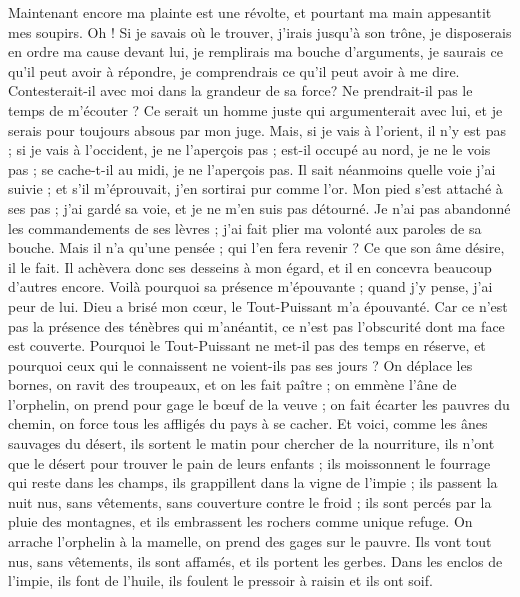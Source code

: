 \begin{multicols}{2}
Maintenant encore ma plainte est une révolte, et pourtant ma main appesantit mes soupirs.
Oh ! Si je savais où le trouver, j'irais jusqu'à son trône,
je disposerais en ordre ma cause devant lui, je remplirais ma bouche d'arguments,
je saurais ce qu'il peut avoir à répondre, je comprendrais ce qu'il peut avoir à me dire.
Contesterait-il avec moi dans la grandeur de sa force? Ne prendrait-il pas le temps de m'écouter ?
Ce serait un homme juste qui argumenterait avec lui, et je serais pour toujours absous par mon juge.
Mais, si je vais à l'orient, il n'y est pas ; si je vais à l'occident, je ne l'aperçois pas ;
est-il occupé au nord, je ne le vois pas ; se cache-t-il au midi, je ne l'aperçois pas.
Il sait néanmoins quelle voie j'ai suivie ; et s'il m'éprouvait, j'en sortirai pur comme l'or.
Mon pied s'est attaché à ses pas ; j'ai gardé sa voie, et je ne m'en suis pas détourné.
Je n'ai pas abandonné les commandements de ses lèvres ; j'ai fait plier ma volonté aux paroles de sa bouche.
Mais il n'a qu'une pensée ; qui l'en fera revenir ? Ce que son âme désire, il le fait.
Il achèvera donc ses desseins à mon égard, et il en concevra beaucoup d'autres encore.
Voilà pourquoi sa présence m'épouvante ; quand j'y pense, j'ai peur de lui.
Dieu a brisé mon cœur, le Tout-Puissant m'a épouvanté.
Car ce n'est pas la présence des ténèbres qui m'anéantit, ce n'est pas l'obscurité dont ma face est couverte.
\VerseOne{}Pourquoi le Tout-Puissant ne met-il pas des temps en réserve, et pourquoi ceux qui le connaissent ne voient-ils pas ses jours ?
On déplace les bornes, on ravit des troupeaux, et on les fait paître ;
on emmène l'âne de l'orphelin, on prend pour gage le bœuf de la veuve ;
on fait écarter les pauvres du chemin, on force tous les affligés du pays à se cacher.
Et voici, comme les ânes sauvages du désert, ils sortent le matin pour chercher de la nourriture, ils n'ont que le désert pour trouver le pain de leurs enfants ;
ils moissonnent le fourrage qui reste dans les champs, ils grappillent dans la vigne de l'impie ;
ils passent la nuit nus, sans vêtements, sans couverture contre le froid ;
ils sont percés par la pluie des montagnes, et ils embrassent les rochers comme unique refuge.
On arrache l'orphelin à la mamelle, on prend des gages sur le pauvre.
Ils vont tout nus, sans vêtements, ils sont affamés, et ils portent les gerbes.
Dans les enclos de l'impie, ils font de l'huile, ils foulent le pressoir à raisin et ils ont soif.

\end{multicols}
